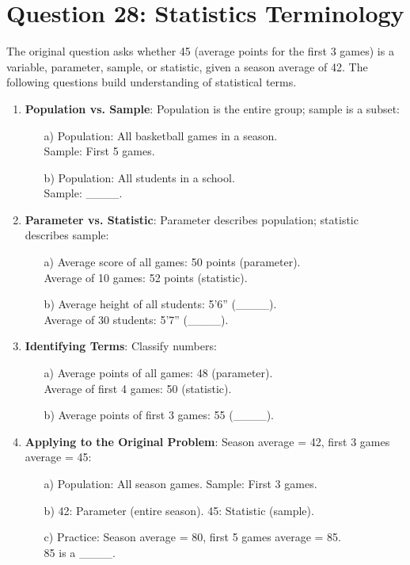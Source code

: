 \documentclass[12pt]{article}
\begin{document}
\section*{Question 28: Statistics Terminology}
The original question asks whether 45 (average points for the first 3 games) is a variable, parameter, sample, or statistic, given a season average of 42. The following questions build understanding of statistical terms.

\begin{enumerate}[label=28.\arabic*]
    \item \textbf{Population vs. Sample}: Population is the entire group; sample is a subset:
    \begin{enumerate}
        \item[a)] Population: All basketball games in a season. \\
        Sample: First 5 games.
        \item[b)] Population: All students in a school. \\
        Sample: \_\_\_\_.
    \end{enumerate}
    \item \textbf{Parameter vs. Statistic}: Parameter describes population; statistic describes sample:
    \begin{enumerate}
        \item[a)] Average score of all games: 50 points (parameter). \\
        Average of 10 games: 52 points (statistic).
        \item[b)] Average height of all students: 5’6” (\_\_\_\_). \\
        Average of 30 students: 5’7” (\_\_\_\_).
    \end{enumerate}
    \item \textbf{Identifying Terms}: Classify numbers:
    \begin{enumerate}
        \item[a)] Average points of all games: 48 (parameter). \\
        Average of first 4 games: 50 (statistic).
        \item[b)] Average points of first 3 games: 55 (\_\_\_\_).
    \end{enumerate}
    \item \textbf{Applying to the Original Problem}: Season average = 42, first 3 games average = 45:
    \begin{enumerate}
        \item[a)] Population: All season games. Sample: First 3 games.
        \item[b)] 42: Parameter (entire season). 45: Statistic (sample).
        \item[c)] Practice: Season average = 80, first 5 games average = 85. \\
        85 is a \_\_\_\_.
    \end{enumerate}
\end{enumerate}

\end{document}
